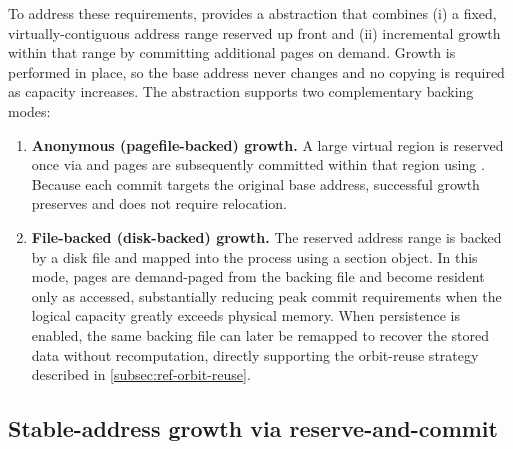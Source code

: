 To address these requirements, \FractalShark{} provides a
 abstraction that combines (i) a fixed,
virtually-contiguous address range reserved up front and (ii) incremental growth
within that range by committing additional pages on demand. Growth is performed
in place, so the base address never changes and no copying is required as
capacity increases. The abstraction supports two complementary backing modes:

\begin{enumerate}
  \item \textbf{Anonymous (pagefile-backed) growth.} A large virtual region is
  reserved once via  and pages are
  subsequently committed within that region using
  . Because each commit
  targets the original base address, successful growth preserves
   and does not require relocation.

  \item \textbf{File-backed (disk-backed) growth.} The reserved address range is
  backed by a disk file and mapped into the process using a section object. In
  this mode, pages are demand-paged from the backing file and become resident
  only as accessed, substantially reducing peak commit requirements when the
  logical capacity greatly exceeds physical memory. When persistence is enabled,
  the same backing file can later be remapped to recover the stored data without
  recomputation, directly supporting the orbit-reuse strategy described in \cref{subsec:ref-orbit-reuse}.
\end{enumerate}

\subsection{Stable-address growth via reserve-and-commit}
\label{sec:reserve_commit}

